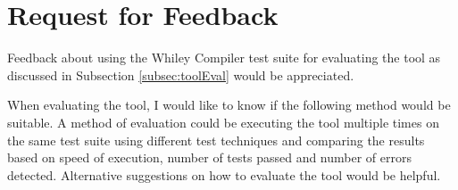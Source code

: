 \section{Request for Feedback}\label{section:feedback}


Feedback about using the Whiley Compiler test suite for evaluating the tool as discussed in Subsection \ref{subsec:toolEval} would be appreciated. 

When evaluating the tool, I would like to know if the following method would be suitable. A method of evaluation could be executing the tool multiple times on the same test suite using different test techniques and comparing the results based on speed of execution, number of tests passed and number of errors detected. 
Alternative suggestions on how to evaluate the tool would be helpful.